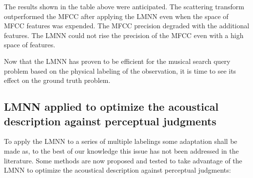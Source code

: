 \documentclass[hidelinks,12pt]{report}
\begin{document}
The results shown in the table above were anticipated. The scattering transform outperformed the MFCC after applying the LMNN even when the space of MFCC features was expended. The MFCC precision degraded with the additional features. The LMNN could not rise the precision of the MFCC even with a high space of features.\par 
Now that the LMNN has proven to be efficient for the musical search query problem based on the physical labeling of the observation, it is time to see its effect on the ground truth problem.

\subsection{LMNN applied to optimize the acoustical description against perceptual judgments}

To apply the LMNN to a series of multiple labelings some adaptation shall be made as, to the best of our knowledge this issue has not been addressed in the literature. Some methods are now proposed and tested to take advantage of the LMNN to optimize the acoustical description against perceptual judgments:
 
\end{document}
